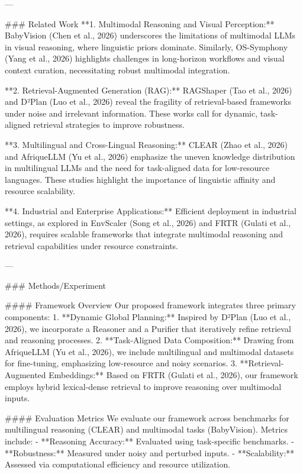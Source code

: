 ---

### Related Work  
**1. Multimodal Reasoning and Visual Perception:**  
BabyVision (Chen et al., 2026) underscores the limitations of multimodal LLMs in visual reasoning, where linguistic priors dominate. Similarly, OS-Symphony (Yang et al., 2026) highlights challenges in long-horizon workflows and visual context curation, necessitating robust multimodal integration.

**2. Retrieval-Augmented Generation (RAG):**  
RAGShaper (Tao et al., 2026) and D²Plan (Luo et al., 2026) reveal the fragility of retrieval-based frameworks under noise and irrelevant information. These works call for dynamic, task-aligned retrieval strategies to improve robustness.

**3. Multilingual and Cross-Lingual Reasoning:**  
CLEAR (Zhao et al., 2026) and AfriqueLLM (Yu et al., 2026) emphasize the uneven knowledge distribution in multilingual LLMs and the need for task-aligned data for low-resource languages. These studies highlight the importance of linguistic affinity and resource scalability.

**4. Industrial and Enterprise Applications:**  
Efficient deployment in industrial settings, as explored in EnvScaler (Song et al., 2026) and FRTR (Gulati et al., 2026), requires scalable frameworks that integrate multimodal reasoning and retrieval capabilities under resource constraints.

---

### Methods/Experiment  

#### Framework Overview  
Our proposed framework integrates three primary components:  
1. **Dynamic Global Planning:** Inspired by D²Plan (Luo et al., 2026), we incorporate a Reasoner and a Purifier that iteratively refine retrieval and reasoning processes.  
2. **Task-Aligned Data Composition:** Drawing from AfriqueLLM (Yu et al., 2026), we include multilingual and multimodal datasets for fine-tuning, emphasizing low-resource and noisy scenarios.  
3. **Retrieval-Augmented Embeddings:** Based on FRTR (Gulati et al., 2026), our framework employs hybrid lexical-dense retrieval to improve reasoning over multimodal inputs.  

#### Evaluation Metrics  
We evaluate our framework across benchmarks for multilingual reasoning (CLEAR) and multimodal tasks (BabyVision). Metrics include:  
- **Reasoning Accuracy:** Evaluated using task-specific benchmarks.  
- **Robustness:** Measured under noisy and perturbed inputs.  
- **Scalability:** Assessed via computational efficiency and resource utilization.

